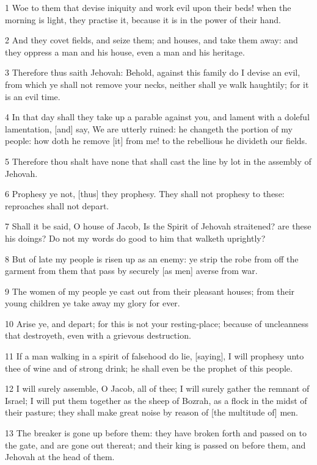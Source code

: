 \par 1 Woe to them that devise iniquity and work evil upon their beds! when the morning is light, they practise it, because it is in the power of their hand.
\par 2 And they covet fields, and seize them; and houses, and take them away: and they oppress a man and his house, even a man and his heritage.
\par 3 Therefore thus saith Jehovah: Behold, against this family do I devise an evil, from which ye shall not remove your necks, neither shall ye walk haughtily; for it is an evil time.
\par 4 In that day shall they take up a parable against you, and lament with a doleful lamentation, [and] say, We are utterly ruined: he changeth the portion of my people: how doth he remove [it] from me! to the rebellious he divideth our fields.
\par 5 Therefore thou shalt have none that shall cast the line by lot in the assembly of Jehovah.
\par 6 Prophesy ye not, [thus] they prophesy. They shall not prophesy to these: reproaches shall not depart.
\par 7 Shall it be said, O house of Jacob, Is the Spirit of Jehovah straitened? are these his doings? Do not my words do good to him that walketh uprightly?
\par 8 But of late my people is risen up as an enemy: ye strip the robe from off the garment from them that pass by securely [as men] averse from war.
\par 9 The women of my people ye cast out from their pleasant houses; from their young children ye take away my glory for ever.
\par 10 Arise ye, and depart; for this is not your resting-place; because of uncleanness that destroyeth, even with a grievous destruction.
\par 11 If a man walking in a spirit of falsehood do lie, [saying], I will prophesy unto thee of wine and of strong drink; he shall even be the prophet of this people.
\par 12 I will surely assemble, O Jacob, all of thee; I will surely gather the remnant of Israel; I will put them together as the sheep of Bozrah, as a flock in the midst of their pasture; they shall make great noise by reason of [the multitude of] men.
\par 13 The breaker is gone up before them: they have broken forth and passed on to the gate, and are gone out thereat; and their king is passed on before them, and Jehovah at the head of them.

